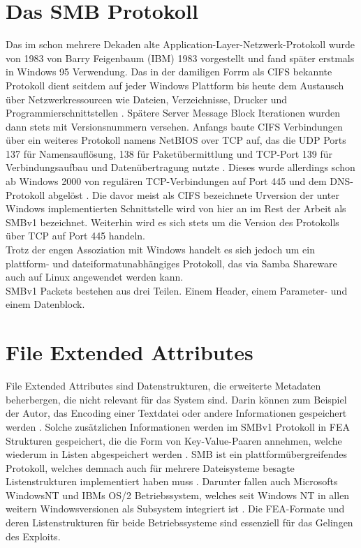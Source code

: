 \documentclass[DIV=12,headings=normal,pdftex,headinclude=false,footinclude=false,final]{scrreprt}
\begin{document}
\section{Das SMB Protokoll}\label{sec:SMB}
Das im schon mehrere Dekaden alte Application-Layer-Netzwerk-Protokoll\cite{Medium} wurde von 1983 von Barry Feigenbaum (IBM) 1983 vorgestellt und fand später erstmals in Windows 95 Verwendung. Das in der damiligen Forrm als CIFS bekannte Protokoll dient seitdem auf jeder Windows Plattform bis heute dem Austausch über Netzwerkressourcen wie Dateien, Verzeichnisse, Drucker und Programmierschnittstellen \cite{CompWeek:SMB}. Spätere Server Message Block Iterationen wurden dann stets mit Versionsnummern versehen. Anfangs baute CIFS Verbindungen über ein weiteres Protokoll namens NetBIOS over TCP auf, das die UDP Ports 137 für Namensauflösung, 138 für Paketübermittlung und TCP-Port 139 für Verbindungsaufbau und Datenübertragung nutzte \cite{MS:NetBIOS}. Dieses wurde allerdings schon ab Windows 2000 von regulären TCP-Verbindungen auf Port 445 und dem DNS-Protokoll abgelöst \cite{IONOS}. Die davor meist als CIFS bezeichnete Urversion der unter Windows implementierten Schnittstelle wird von hier an im Rest der Arbeit als SMBv1 bezeichnet. Weiterhin wird es sich stets um die Version des Protokolls über TCP auf Port 445 handeln.\\
Trotz der engen Assoziation mit Windows handelt es sich jedoch um ein plattform- und dateiformatunabhängiges Protokoll, das via Samba Shareware auch auf Linux angewendet werden kann\cite{IONOS}.\\
SMBv1 Packets bestehen aus drei Teilen. Einem Header, einem Parameter- und einem Datenblock.

\section{File Extended Attributes}\label{sec:FEA}
File Extended Attributes sind Datenstrukturen, die erweiterte Metadaten beherbergen, die nicht relevant für das System sind. Darin können zum Beispiel der Autor, das Encoding einer Textdatei oder andere Informationen gespeichert werden \cite{Wiki:FEA}. Solche zusätzlichen Informationen werden im SMBv1 Protokoll in FEA Strukturen gespeichert, die die Form von Key-Value-Paaren annehmen, welche wiederum in Listen abgespeichert werden \cite{CP}. SMB ist ein plattformübergreifendes Protokoll, welches demnach auch für mehrere Dateisysteme besagte Listenstrukturen implementiert haben muss \cite{CompWeek:SMB}. Darunter fallen auch Microsofts WindowsNT und IBMs OS/2 Betriebssystem, welches seit Windows NT in allen weitern Windowsversionen als Subsystem integriert ist \cite{MS:OS2Subsys}. Die FEA-Formate und deren Listenstrukturen für beide Betriebssysteme sind essenziell für das Gelingen des Exploits.
\end{document}
